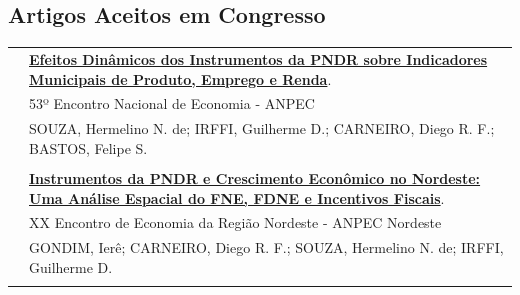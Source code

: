 \documentclass[a4paper,12pt]{article}
\begin{document}
	\subsection*{Artigos Aceitos em Congresso}
	\setlength{\LTleft}{0pt}
	\begin{longtable}[t]{>{\raggedleft\arraybackslash}p{2.0cm}>{\raggedright\arraybackslash}p{13.5cm}}
		2025 & \href{https://www.anpec.org.br/encontro/2025/submissao/files_I/i10-122223bba2914979f052512e41d1e1f7.pdf}{\textbf{Efeitos Dinâmicos dos Instrumentos da PNDR sobre Indicadores Municipais de Produto, Emprego e Renda}}. \\
		& 53º Encontro Nacional de Economia - ANPEC \\
		& SOUZA, Hermelino N. de; IRFFI, Guilherme D.; CARNEIRO, Diego R. F.; BASTOS, Felipe S. \\

		\multicolumn{2}{c}{\vspace{-0.2cm}} \\

		2025 & \href{https://www.anpec.org.br/nordeste/2025/submissao/arquivos_identificados/045-821b2d69029114749e9f3597ac6a9952.pdf}{\textbf{Instrumentos da PNDR e Crescimento Econômico no Nordeste: Uma Análise Espacial do FNE, FDNE e Incentivos Fiscais}}. \\
		& XX Encontro de Economia da Região Nordeste - ANPEC Nordeste \\
		& GONDIM, Ierê; CARNEIRO, Diego R. F.; SOUZA, Hermelino N. de; IRFFI, Guilherme D. \\
		
		\multicolumn{2}{c}{\vspace{-0.2cm}} \\
	\end{longtable}
\end{document}
